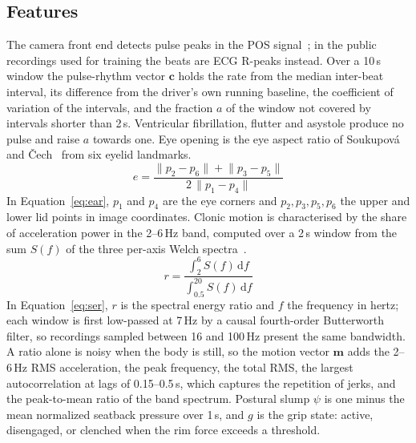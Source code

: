 \documentclass[conference]{IEEEtran}
\begin{document}
\subsection{Features}
The camera front end detects pulse peaks in the POS signal~\cite{wang2017pos}; in the public recordings used for training the beats are ECG R-peaks instead. Over a 10\,s window the pulse-rhythm vector $\mathbf{c}$ holds the rate from the median inter-beat interval, its difference from the driver's own running baseline, the coefficient of variation of the intervals, and the fraction $a$ of the window not covered by intervals shorter than 2\,s. Ventricular fibrillation, flutter and asystole produce no pulse and raise $a$ towards one. Eye opening is the eye aspect ratio of Soukupov\'a and \v{C}ech~\cite{soukupova2016} from six eyelid landmarks.
\begin{equation}
e=\frac{\lVert p_2-p_6\rVert+\lVert p_3-p_5\rVert}{2\,\lVert p_1-p_4\rVert}
\label{eq:ear}
\end{equation}
In Equation~\eqref{eq:ear}, $p_1$ and $p_4$ are the eye corners and $p_2,p_3,p_5,p_6$ the upper and lower lid points in image coordinates. Clonic motion is characterised by the share of acceleration power in the 2--6\,Hz band, computed over a 2\,s window from the sum $S(f)$ of the three per-axis Welch spectra~\cite{welch1967}.
\begin{equation}
r=\frac{\int_{2}^{6}S(f)\,\mathrm{d}f}{\int_{0.5}^{20}S(f)\,\mathrm{d}f}
\label{eq:ser}
\end{equation}
In Equation~\eqref{eq:ser}, $r$ is the spectral energy ratio and $f$ the frequency in hertz; each window is first low-passed at 7\,Hz by a causal fourth-order Butterworth filter, so recordings sampled between 16 and 100\,Hz present the same bandwidth. A ratio alone is noisy when the body is still, so the motion vector $\mathbf{m}$ adds the 2--6\,Hz RMS acceleration, the peak frequency, the total RMS, the largest autocorrelation at lags of 0.15--0.5\,s, which captures the repetition of jerks, and the peak-to-mean ratio of the band spectrum. Postural slump $\psi$ is one minus the mean normalized seatback pressure over 1\,s, and $g$ is the grip state: active, disengaged, or clenched when the rim force exceeds a threshold.
\end{document}
